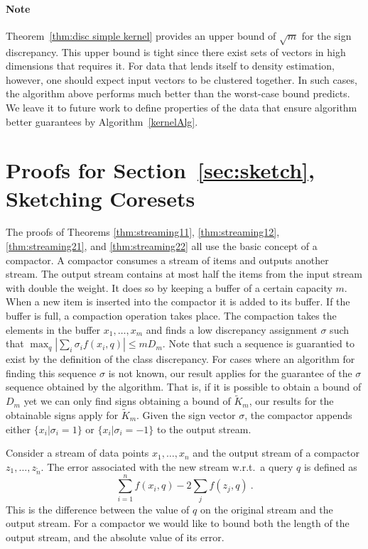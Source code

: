 \documentclass[anon,12pt]{colt2019} %
\begin{document}
{\paragraph{Note} Theorem~\ref{thm:disc simple kernel} provides an upper bound of $\sqrt{m}$ for the sign discrepancy. 
This upper bound is tight since there exist sets of vectors in high dimensions that requires it. 
For data that lends itself to density estimation, however, one should expect input vectors to be clustered together.
In such cases, the algorithm above performs much better than the worst-case bound predicts. 
We leave it to future work to define properties of the data that ensure algorithm better guarantees by Algorithm~\ref{kernelAlg}.


\appendix

\section{Proofs for Section~\ref{sec:sketch}, Sketching Coresets} \label{app:sketch proof}


The proofs of Theorems \ref{thm:streaming11}, \ref{thm:streaming12}, \ref{thm:streaming21}, and \ref{thm:streaming22} all use the basic concept of a compactor. A compactor consumes a stream of items and outputs another stream. 
The output stream contains at most half the items from the input stream with double the weight. 
It does so by keeping a buffer of a certain capacity $m$. When a new item is inserted into the compactor it is added to its buffer. 
If the buffer is full, a compaction operation takes place. 
The compaction takes the elements in the buffer $x_1,\ldots,x_m$ and finds a low discrepancy assignment $\sigma$ such that 
$\max_q |\sum_i \sigma_i f(x_i,q)| \leq m D_m$. 
Note that such a sequence is guarantied to exist by the definition of the class discrepancy. For cases where an algorithm for finding this sequence $\sigma$ is not known, our result applies for the guarantee of the $\sigma$ sequence obtained by the algorithm. That is, if it is possible to obtain a bound of $D_m$ yet we can only find signs obtaining a bound of $\tilde{K}_m$, our results for the obtainable signs apply for $\tilde{K}_m$.
Given the sign vector $\sigma$, the compactor appends either $\{ x_i | \sigma_i = 1\}$ or  $\{ x_i | \sigma_i = -1\}$ to the output stream. 

Consider a stream of data points $x_1,\ldots,x_n$ and the output stream of a compactor $z_1,\ldots,z_{\tilde{n}}$. The error associated with the new stream w.r.t.\ a query $q$ is defined as
$$ \sum_{i=1}^n f(x_i,q) - 2\sum_j f(z_j,q) \ .$$
This is the difference between the value of $q$ on the original stream and the output stream. For a compactor we would like to bound both the length of the output stream, and the absolute value of its error.

}
\end{document}
